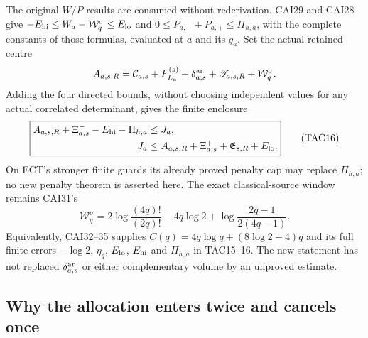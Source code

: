 The original $W/P$ results are consumed without rederivation.
CAI29 and CAI28 give
$-E_{\rm hi}\le W_a-\mathcal W_q^\sigma\le E_{\rm lo}$ and
$0\le P_{a,-}+P_{a,+}\le\Pi_{h,a}$, with the complete constants of
those formulas, evaluated at $a$ and its $q_a$.
Set the actual retained centre
\[
 A_{a,s,R}=\mathcal C_{a,s}+F_{L_a}^{(s)}
              +\delta_{a,s}^{\rm ar}+\mathscr T_{a,s,R}
              +\mathcal W_q^\sigma.
\]
Adding the four directed bounds, without choosing independent values
for any actual correlated determinant, gives the finite enclosure
\[
 \boxed{\begin{split}
 A_{a,s,R}+\Xi^-_{a,s}-E_{\rm hi}-\Pi_{h,a}
       &\le J_a,\\
 J_a&\le A_{a,s,R}+\Xi^+_{a,s}
                         +\mathfrak E_{s,R}+E_{\rm lo}.
 \end{split}}
 \tag{TAC16}
\]
On ECT's stronger finite guards its already proved penalty cap may
replace $\Pi_{h,a}$; no new penalty theorem is asserted here.
The exact classical-source window remains CAI31's
\[
 \mathcal W_q^\sigma
 =2\log\frac{(4q)!}{(2q)!}-4q\log2+
                         \log\frac{2q-1}{2(4q-1)}.
\]
Equivalently, CAI32--35 supplies $C(q)=4q\log q+(8\log2-4)q$
and its full finite errors $-\log2$, $\eta_q$, $E_{\rm lo}$,
$E_{\rm hi}$ and $\Pi_{h,a}$ in TAC15--16.  The new statement
has not replaced $\delta_{a,s}^{\rm ar}$ or either complementary
volume by an unproved estimate.

\subsection{Why the allocation enters twice and cancels once}

